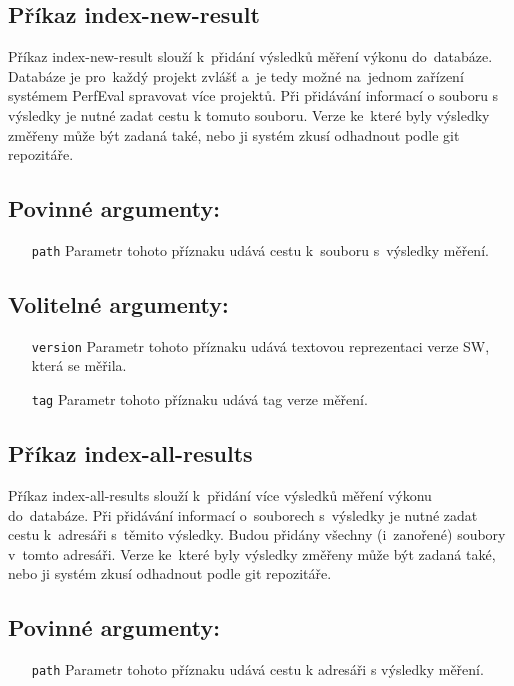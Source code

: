 \subsection{Příkaz index-new-result}

Příkaz index-new-result slouží k~přidání výsledků měření výkonu do~databáze. Databáze
je pro~každý projekt zvlášť a~je tedy možné na~jednom zařízení systémem PerfEval spravovat více projektů.
Při přidávání informací o souboru s výsledky je nutné zadat cestu k tomuto souboru.
Verze ke~které byly výsledky změřeny může být zadaná také, nebo ji systém zkusí odhadnout
podle git repozitáře.

\subsection*{Povinné argumenty:}
\begin{itemize}[label=\texttt{\textbf{\textendash}}]
    \item[\texttt{path}] Parametr tohoto příznaku udává cestu k~souboru s~výsledky měření.
\end{itemize}

\subsection*{Volitelné argumenty:}
\begin{itemize}[label=\texttt{\textbf{\textendash}}]
    \item[\texttt{version}] Parametr tohoto příznaku udává textovou reprezentaci verze SW, která se měřila.
    \item[\texttt{tag}] Parametr tohoto příznaku udává tag verze měření.
\end{itemize}

\subsection{Příkaz index-all-results}

Příkaz index-all-results slouží k~přidání více výsledků měření výkonu do~databáze.
Při přidávání informací o~souborech s~výsledky je nutné zadat cestu k~adresáři s~těmito výsledky.
Budou přidány všechny (i~zanořené) soubory v~tomto adresáři.
Verze ke~které byly výsledky změřeny může být zadaná také, nebo ji systém zkusí odhadnout
podle git repozitáře.

\subsection*{Povinné argumenty:}
\begin{itemize}[label=\texttt{\textbf{\textendash}}]
    \item[\texttt{path}] Parametr tohoto příznaku udává cestu k adresáři s výsledky měření.
\end{itemize}

